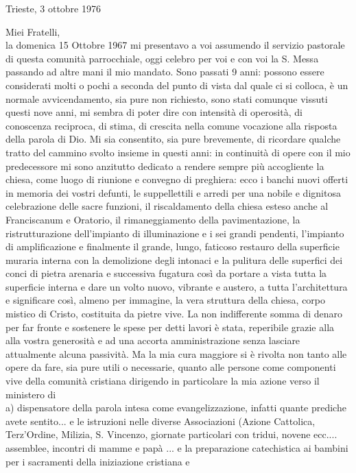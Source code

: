\begin{flushright}
Trieste, 3 ottobre 1976
\end{flushright}
Miei Fratelli,\\[0.25cm]
la domenica 15 Ottobre 1967 mi presentavo a voi assumendo il servizio pastorale di questa comunità parrocchiale, oggi celebro per voi e con voi la S. Messa passando ad altre mani il mio mandato.
Sono passati 9 anni: possono essere considerati molti o pochi a seconda del punto di vista dal quale ci si colloca, è un normale avvicendamento, sia pure non richiesto, sono stati comunque vissuti 
questi nove anni, mi sembra di poter dire con intensità di operosità, di conoscenza reciproca, di stima, di crescita nella comune vocazione alla risposta della parola di Dio.
Mi sia consentito, sia pure brevemente, di ricordare qualche tratto del cammino svolto insieme in questi anni:
in continuità di opere con il mio predecessore mi sono anzitutto dedicato a rendere sempre più accogliente la chiesa, come luogo di riunione e convegno di preghiera: 
ecco i banchi nuovi offerti in memoria dei vostri defunti, le suppellettili e arredi per una nobile e dignitosa celebrazione delle sacre funzioni, il riscaldamento della chiesa esteso anche al 
Franciscanum e Oratorio, il rimaneggiamento della pavimentazione, la ristrutturazione dell’impianto di illuminazione e i sei grandi pendenti, l’impianto di amplificazione e finalmente
il grande, lungo, faticoso restauro della superficie muraria interna con la demolizione degli intonaci e la pulitura delle superfici dei conci di pietra arenaria e successiva fugatura così
da portare a vista tutta la superficie interna e dare un volto nuovo, vibrante e austero, a tutta l'architettura e significare così, almeno per immagine, la vera struttura della chiesa, corpo
mistico di Cristo, costituita da pietre vive.
La non indifferente somma di denaro per far fronte e sostenere le spese per detti lavori è stata, reperibile grazie alla alla vostra generosità e ad una accorta amministrazione senza lasciare
attualmente alcuna passività.
Ma la mia cura maggiore si è rivolta non tanto alle opere da fare, sia pure utili o necessarie, quanto alle persone come componenti vive della comunità cristiana dirigendo in particolare 
la mia azione verso il ministero di\\
a) dispensatore della parola intesa come evangelizzazione, infatti quante prediche avete sentito... e le istruzioni nelle diverse Associazioni (Azione Cattolica, Terz'Ordine, Milizia, 
S. Vincenzo, giornate particolari con tridui, novene ecc.... assemblee, incontri di mamme e papà ... e la preparazione catechistica ai bambini per i sacramenti della iniziazione cristiana e 
